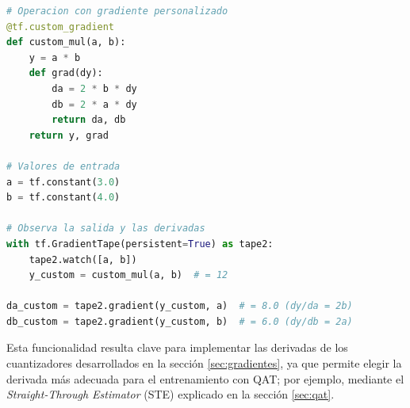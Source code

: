 \begin{lstlisting}[language=Python,label=code:customgradient,caption=Definición de una operación con gradiente personalizado en TensorFlow.]
# Operacion con gradiente personalizado
@tf.custom_gradient
def custom_mul(a, b):
    y = a * b
    def grad(dy):
        da = 2 * b * dy
        db = 2 * a * dy
        return da, db
    return y, grad

# Valores de entrada
a = tf.constant(3.0)
b = tf.constant(4.0)

# Observa la salida y las derivadas
with tf.GradientTape(persistent=True) as tape2:
    tape2.watch([a, b])
    y_custom = custom_mul(a, b)  # = 12

da_custom = tape2.gradient(y_custom, a)  # = 8.0 (dy/da = 2b)
db_custom = tape2.gradient(y_custom, b)  # = 6.0 (dy/db = 2a)
\end{lstlisting}

Esta funcionalidad resulta clave para implementar las derivadas de los cuantizadores desarrollados en la sección \ref{sec:gradientes}, ya que permite elegir la derivada más adecuada para el entrenamiento con QAT; por ejemplo, mediante el \textit{Straight-Through Estimator} (STE) explicado en la sección \ref{sec:qat}.

